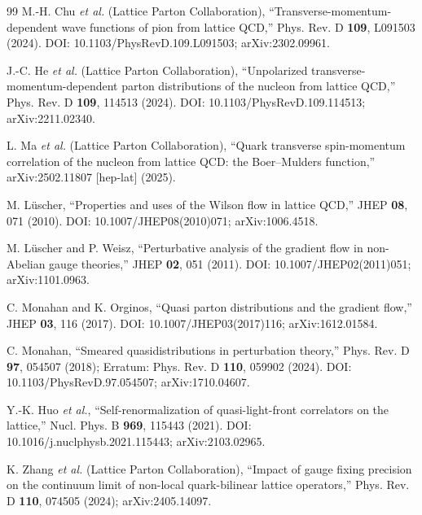 \documentclass[UTF8,12pt,a4paper,twoside,openany]{ctexbook}
\begin{document}
\begin{thebibliography}{99}
M.-H. Chu \textit{et al.} (Lattice Parton Collaboration),
\newblock ``Transverse-momentum-dependent wave functions of pion from lattice QCD,''
\newblock Phys. Rev. D \textbf{109}, L091503 (2024).
\newblock DOI: 10.1103/PhysRevD.109.L091503; arXiv:2302.09961.

J.-C. He \textit{et al.} (Lattice Parton Collaboration),
\newblock ``Unpolarized transverse-momentum-dependent parton distributions of the nucleon from lattice QCD,''
\newblock Phys. Rev. D \textbf{109}, 114513 (2024).
\newblock DOI: 10.1103/PhysRevD.109.114513; arXiv:2211.02340.

L. Ma \textit{et al.} (Lattice Parton Collaboration),
\newblock ``Quark transverse spin-momentum correlation of the nucleon from lattice QCD: the Boer--Mulders function,''
\newblock arXiv:2502.11807 [hep-lat] (2025).

M. Lüscher,
\newblock ``Properties and uses of the Wilson flow in lattice QCD,''
\newblock JHEP \textbf{08}, 071 (2010).
\newblock DOI: 10.1007/JHEP08(2010)071; arXiv:1006.4518.

M. Lüscher and P. Weisz,
\newblock ``Perturbative analysis of the gradient flow in non-Abelian gauge theories,''
\newblock JHEP \textbf{02}, 051 (2011).
\newblock DOI: 10.1007/JHEP02(2011)051; arXiv:1101.0963.

C. Monahan and K. Orginos,
\newblock ``Quasi parton distributions and the gradient flow,''
\newblock JHEP \textbf{03}, 116 (2017).
\newblock DOI: 10.1007/JHEP03(2017)116; arXiv:1612.01584.

C. Monahan,
\newblock ``Smeared quasidistributions in perturbation theory,''
\newblock Phys. Rev. D \textbf{97}, 054507 (2018); Erratum: Phys. Rev. D \textbf{110}, 059902 (2024).
\newblock DOI: 10.1103/PhysRevD.97.054507; arXiv:1710.04607.

Y.-K. Huo \textit{et al.},
\newblock ``Self-renormalization of quasi-light-front correlators on the lattice,''
\newblock Nucl. Phys. B \textbf{969}, 115443 (2021).
\newblock DOI: 10.1016/j.nuclphysb.2021.115443; arXiv:2103.02965.

K. Zhang \textit{et al.} (Lattice Parton Collaboration),
\newblock ``Impact of gauge fixing precision on the continuum limit of non-local quark-bilinear lattice operators,''
\newblock Phys. Rev. D \textbf{110}, 074505 (2024); arXiv:2405.14097.


\end{thebibliography}
\end{document}

